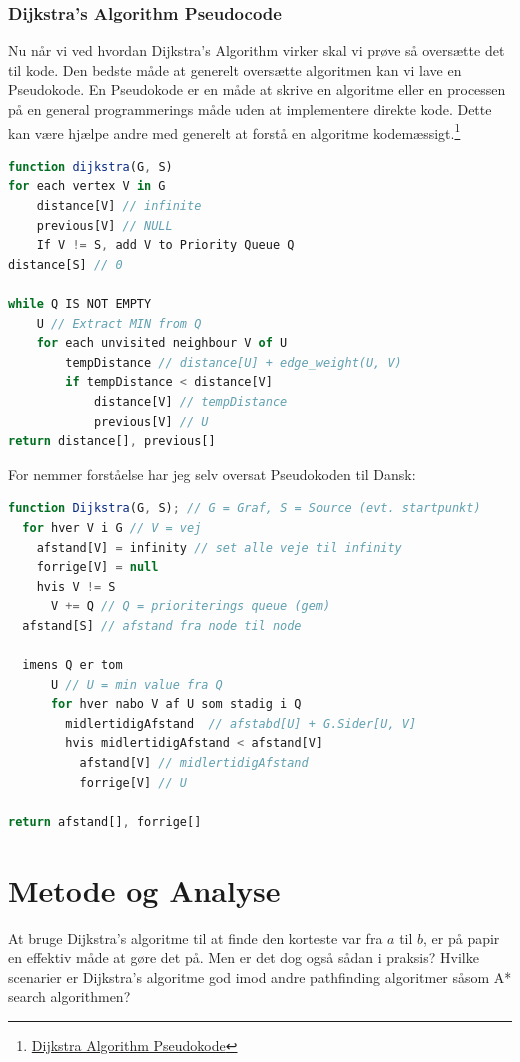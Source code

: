 \documentclass[12pt]{article}
\begin{document}
\subsubsection{Dijkstra’s Algorithm Pseudocode}
Nu når vi ved hvordan Dijkstra’s Algorithm virker skal vi prøve så oversætte det til kode.
Den bedste måde at generelt oversætte algoritmen kan vi lave en Pseudokode. En Pseudokode er en måde at skrive en algoritme eller en processen på en general programmerings måde uden at implementere direkte kode. Dette kan være hjælpe andre med generelt at forstå en algoritme kodemæssigt.\footnote{\href{https://www.programiz.com/dsa/dijkstra-algorithm}{Dijkstra Algorithm Pseudokode}}
\begin{lstlisting}[language=JavaScript, caption=Dijkstra’s Algorithm Pseudocode teoritisk (på Engelsk)]
function dijkstra(G, S)
for each vertex V in G
    distance[V] // infinite
    previous[V] // NULL
    If V != S, add V to Priority Queue Q
distance[S] // 0

while Q IS NOT EMPTY
    U // Extract MIN from Q
    for each unvisited neighbour V of U
        tempDistance // distance[U] + edge_weight(U, V)
        if tempDistance < distance[V]
            distance[V] // tempDistance
            previous[V] // U
return distance[], previous[]
\end{lstlisting}
For nemmer forståelse har jeg selv oversat Pseudokoden til Dansk:
\begin{lstlisting}[language=JavaScript, caption=Dijkstra’s Algorithm Pseudocode oversat til Dansk]
function Dijkstra(G, S); // G = Graf, S = Source (evt. startpunkt)
  for hver V i G // V = vej
    afstand[V] = infinity // set alle veje til infinity
    forrige[V] = null
    hvis V != S
      V += Q // Q = prioriterings queue (gem)
  afstand[S] // afstand fra node til node

  imens Q er tom
      U // U = min value fra Q
      for hver nabo V af U som stadig i Q
        midlertidigAfstand  // afstabd[U] + G.Sider[U, V]
        hvis midlertidigAfstand < afstand[V]
          afstand[V] // midlertidigAfstand
          forrige[V] // U

return afstand[], forrige[]
\end{lstlisting}
  

\newpage
\section{Metode og Analyse}
At bruge Dijkstra's algoritme til at finde den korteste var fra $a$ til $b$, er på papir en effektiv måde at gøre det på. Men er det dog også sådan i praksis? Hvilke scenarier er Dijkstra's algoritme god imod andre pathfinding algoritmer såsom A* search algorithmen? 
\end{document}
